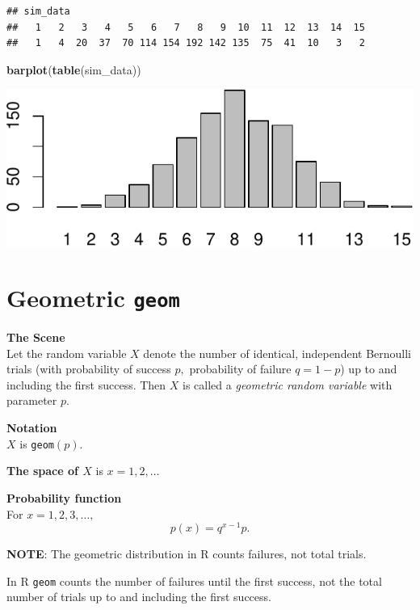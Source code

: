 \documentclass[
]{book}
\newenvironment{Shaded}{\begin{snugshade}}{\end{snugshade}}
\newcommand{\FunctionTok}[1]{\textcolor[rgb]{0.13,0.29,0.53}{\textbf{#1}}}
\newcommand{\NormalTok}[1]{#1}
\theoremstyle{definition}
\theoremstyle{definition}
\theoremstyle{definition}
\theoremstyle{definition}
\theoremstyle{remark}
\begin{document}
\begin{verbatim}
## sim_data
##   1   2   3   4   5   6   7   8   9  10  11  12  13  14  15 
##   1   4  20  37  70 114 154 192 142 135  75  41  10   3   2
\end{verbatim}

\begin{Shaded}
\begin{Highlighting}[]
\FunctionTok{barplot}\NormalTok{(}\FunctionTok{table}\NormalTok{(sim\_data))}
\end{Highlighting}
\end{Shaded}

\includegraphics{math340-notes_files/figure-latex/unnamed-chunk-163-1.pdf}

\section{\texorpdfstring{Geometric \texttt{geom}}{Geometric geom}}\label{geometricR}

\textbf{The Scene}\\
Let the random variable \(X\) denote the number of identical, independent Bernoulli trials (with probability of success \(p,\) probability of failure \(q = 1-p\)) up to and including the first success.
Then \(X\) is called a \emph{geometric random variable} with parameter \(p\).

\textbf{Notation}\\
\(X\) is \texttt{geom}\((p)\).

\textbf{The space of \(X\)} is \(x = 1, 2, \ldots\)

\textbf{Probability function}\\
For \(x = 1, 2, 3, \ldots,\) \[p(x)= q^{x-1}p.\]

\textbf{NOTE}: The geometric distribution in R counts failures, not total trials.

In R \texttt{geom} counts the number of failures until the first success, not the total number of trials up to and including the first success.
\end{document}
